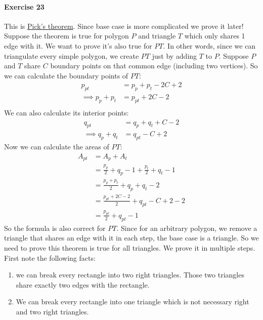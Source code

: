 \documentclass{book}
\begin{document}
	\paragraph{Exercise 23}
	This is \href{https://en.wikipedia.org/wiki/Pick's_theorem}{Pick's theorem}. Since base case is more complicated we prove it later! Suppose the theorem is true for polygon $P$ and triangle $T$ which only shares 1 edge with it. We want to prove it's also true for $PT$. In other words, since we can triangulate every simple polygon, we create $PT$ just by adding $T$ to $P$. Suppose $P$ and $T$ share $C$ boundary points on that common edge (including two vertices). So we can calculate the boundary points of $PT$:
	\begin{equation*}
		\begin{split}
			p_{pt} &= p_{p} + p_{t} - 2C + 2 \\
			\implies p_{p} + p_{t} &= p_{pt} + 2C - 2 \\
		\end{split}
	\end{equation*}
	We can also calculate its interior points:
	\begin{equation*}
		\begin{split}
			q_{pt} &= q_{p} + q_{t} + C - 2 \\
			\implies q_{p} + q_{t} &= q_{pt} - C + 2
		\end{split}
	\end{equation*}
	Now we can calculate the areas of $PT$:
	\begin{equation*}
		\begin{split}
			A_{pt} &= A_p + A_t \\
			&= \frac{p_p}{2} + q_p - 1 + \frac{p_t}{2} + q_t - 1 \\
			&= \frac{p_p + p_t}{2} + q_p + q_t - 2 \\
			&= \frac{p_{pt} + 2C - 2}{2} + q_{pt} - C + 2 - 2 \\
			&= \frac{p_{pt}}{2} + q_{pt} - 1
		\end{split}
	\end{equation*}
	So the formula is also correct for $PT$. Since for an arbitrary polygon, we remove a triangle that shares an edge with it in each step, the base case is a triangle. So we need to prove this theorem is true for all triangles. We prove it in multiple steps. First note the following facts:
	\begin{enumerate}
		\item we can break every rectangle into two right triangles. Those two triangles share exactly two edges with the rectangle.
		\item We can break every rectangle into one triangle which is not necessary right and two right triangles.
	\end{enumerate}
\end{document}
